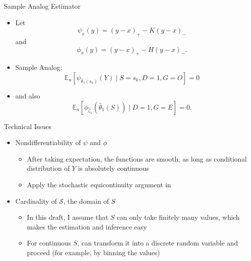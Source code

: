 \documentclass{beamer}					%
\begin{document}
\begin{frame}{Sample Analog Estimator}
    \begin{itemize}
    \item Let $$\psi_x(y) = (y - x)_+ - K (y - x)_-$$ and $$\phi_x(y) = (y - x)_+ - H (y - x)_-.$$
    \item Sample Analog: $$
	\mathbb{E}_n\left[\psi_{\hat{\theta}_1(s_k)}(Y) \mid S = s_k, D=1, G=O\right] = 0
	$$
	\item and also \begin{equation*}
	\mathbb{E}_n\left[\phi_{\hat{\zeta}_1}(\hat{\theta}_1(S)) \mid D=1, G=E\right] = 0.
	\end{equation*}
    \end{itemize}
\end{frame}

\begin{frame}{Technical Issues}
    \begin{itemize}
        \item Nondifferentiability of $\psi$ and $\phi$
        \begin{itemize}
            \item After taking expectation, the functions are smooth, as long as conditional distribution of $Y$ is absolutely continuous
            \item Apply the stochastic equicontinuity argument in \textcite{andrews1994asymptotics}
        \end{itemize}
        \item Cardinality of $\mathcal{S}$, the domain of $S$ 
        \begin{itemize}
            \item In this draft, I assume that $S$ can only take finitely many values, which makes the estimation and inference easy
            \item For continuous $S$, can transform it into a discrete random variable and proceed (for example, by binning the values) 
        \end{itemize}
    \end{itemize}
\end{frame}
\end{document}
